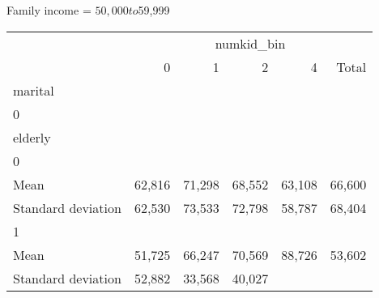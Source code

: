 Family income = $50,000 to $59,999
\begin{tabular}{llllll}
\cline{1-6}
\multicolumn{1}{c}{} &
  \multicolumn{5}{|c}{numkid\_bin} \\
\multicolumn{1}{c}{} &
  \multicolumn{1}{|r}{0} &
  \multicolumn{1}{r}{1} &
  \multicolumn{1}{r}{2} &
  \multicolumn{1}{r}{4} &
  \multicolumn{1}{r}{Total} \\
\cline{1-6}
\multicolumn{1}{l}{marital} &
  \multicolumn{1}{|r}{} &
  \multicolumn{1}{r}{} &
  \multicolumn{1}{r}{} &
  \multicolumn{1}{r}{} &
  \multicolumn{1}{r}{} \\
\multicolumn{1}{l}{\hspace{1em}0} &
  \multicolumn{1}{|r}{} &
  \multicolumn{1}{r}{} &
  \multicolumn{1}{r}{} &
  \multicolumn{1}{r}{} &
  \multicolumn{1}{r}{} \\
\multicolumn{1}{l}{\hspace{2em}elderly} &
  \multicolumn{1}{|r}{} &
  \multicolumn{1}{r}{} &
  \multicolumn{1}{r}{} &
  \multicolumn{1}{r}{} &
  \multicolumn{1}{r}{} \\
\multicolumn{1}{l}{\hspace{3em}0} &
  \multicolumn{1}{|r}{} &
  \multicolumn{1}{r}{} &
  \multicolumn{1}{r}{} &
  \multicolumn{1}{r}{} &
  \multicolumn{1}{r}{} \\
\multicolumn{1}{l}{\hspace{4em}Mean} &
  \multicolumn{1}{|r}{62,816} &
  \multicolumn{1}{r}{71,298} &
  \multicolumn{1}{r}{68,552} &
  \multicolumn{1}{r}{63,108} &
  \multicolumn{1}{r}{66,600} \\
\multicolumn{1}{l}{\hspace{4em}Standard deviation} &
  \multicolumn{1}{|r}{62,530} &
  \multicolumn{1}{r}{73,533} &
  \multicolumn{1}{r}{72,798} &
  \multicolumn{1}{r}{58,787} &
  \multicolumn{1}{r}{68,404} \\
\multicolumn{1}{l}{\hspace{3em}1} &
  \multicolumn{1}{|r}{} &
  \multicolumn{1}{r}{} &
  \multicolumn{1}{r}{} &
  \multicolumn{1}{r}{} &
  \multicolumn{1}{r}{} \\
\multicolumn{1}{l}{\hspace{4em}Mean} &
  \multicolumn{1}{|r}{51,725} &
  \multicolumn{1}{r}{66,247} &
  \multicolumn{1}{r}{70,569} &
  \multicolumn{1}{r}{88,726} &
  \multicolumn{1}{r}{53,602} \\
\multicolumn{1}{l}{\hspace{4em}Standard deviation} &
  \multicolumn{1}{|r}{52,882} &
  \multicolumn{1}{r}{33,568} &
  \multicolumn{1}{r}{40,027} &

\end{tabular}
